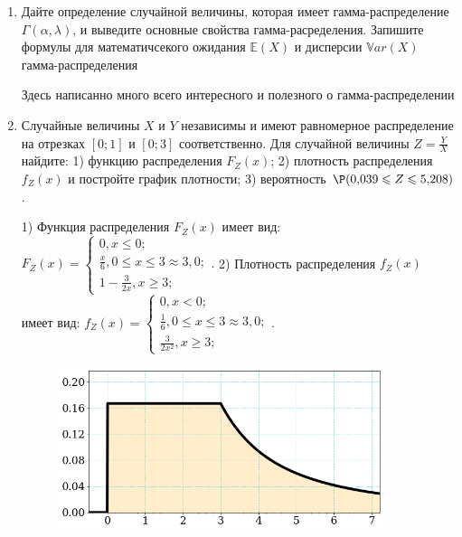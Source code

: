 \documentclass[a4paper,14pt]{article}
\begin{document}
\begin{enumerate}


\item

Дайте определение случайной величины, которая имеет гамма-распределение $\Gamma(\alpha,  \lambda)$, и выведите основные свойства гамма-расределения. Запишите формулы для математичсекого ожидания
$\mathbb{E}(X)$ и дисперсии $\mathbb{V}ar(X)$ гамма-распределения




Здесь написанно много всего интересного и полезного о гамма-распределении


\item



Случайные величины $X$ и $Y$ независимы и имеют равномерное
распределение на отрезках $[0;1]$ и $[0;3]$ соответственно. Для случайной величины $Z=\frac{Y}{X}$ найдите: 
1) функцию распределения $F_Z(x)$;
2) плотность распределения $f_Z(x)$ и постройте график плотности;
3) вероятность $\P(0,\!039\leqslant Z\leqslant 5,\!208)$.




1) Функция распределения $F_Z(x)$ имеет вид:
$
F_Z(x)=\left\{
\begin{array}{l}
0, x\leqslant 0;\\
\frac{x}{6}, 0\leqslant x\leqslant 3\approx 3,\!0;\\
1 - \frac{3}{2 x}, x\geqslant3;
\end{array}.
\right.
$
2) Плотность распределения $f_Z(x)$ имеет вид:
$
f_Z(x)=\left\{
\begin{array}{l}
0, x<0;\\
\frac{1}{6}, 0\leqslant x\leqslant 3\approx 3,\!0;\\
\frac{3}{2 x^{2}}, x\geqslant3;
\end{array}.
\right.
$


\begin{figure}[H]
    \includegraphics[width=0.9\textwidth]{2_53d21}
\end{figure}



\end{enumerate}
\end{document}
